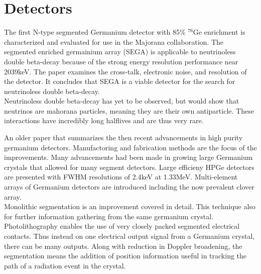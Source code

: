 \documentclass[12pt]{article}
\begin{document}
\section{Detectors}   %

{\large\textbf{\cite{Leviner201466}}}

The first N-type segmented Germanium detector with 85\% $^{76}\mbox{Ge}$ enrichment is characterized and evaluated for use in the Majorana collaboration. The segmented enriched germainium array (SEGA) is applicable to neutrinoless double beta-decay because of the strong energy resolution performance near 2039keV. The paper examines the cross-talk, electronic noise, and resolution of the detector. It concludes that SEGA is a viable detector for the search for neutrinoless double beta-decay.
\\
Neutrinoless double beta-decay has yet to be observed, but would show that neutrinos are mahorana particles, meaning they are their own antiparticle. These interactions have incredibly long halflives and are thus very rare.
\\[20pt]


{\large\textbf{\cite{Sangsingkeow2003183}}}

An older paper that summarizes the then recent advancements in high purity germanium detectors. Manufactoring and fabrication methods are the focus of the improvements. Many advancements had been made in growing large Germanium crystals that allowed for many segment detectors. Large efficieny HPGe detectors are presented with FWHM resolutions of 2.4keV at 1.33MeV. Multi-element arrays of Germanium detectors are introduced including the now prevalent clover array.
\\
Monolithic segmentation is an improvement covered in detail. This technique also for further information gathering from the same germanium crystal. Photolithography enables the use of very closely packed segmented electrical contacts. Thus instead on one electrical output signal from a Germanium crystal, there can be many outputs. Along with reduction in Doppler broadening, the segmentation means the addition of position information useful in tracking the path of a radiation event in the crystal.
\\[20pt]


{\large\textbf{\cite{Eberth2008283}}}
\end{document}
